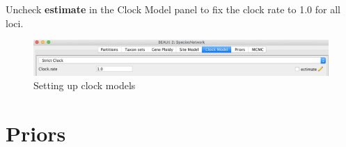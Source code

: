 \documentclass[11pt]{article}
\begin{document}
Uncheck {\bf estimate} in the Clock Model panel to fix the clock rate to 1.0 for all loci.
\begin{figure}[h]
\center
\includegraphics[width=1.0\textwidth]{figs/fig6_clockmodel}
\caption{Setting up clock models}
\label{fig_clockmodel}
\end{figure}

\section*{Priors}




\end{document}
